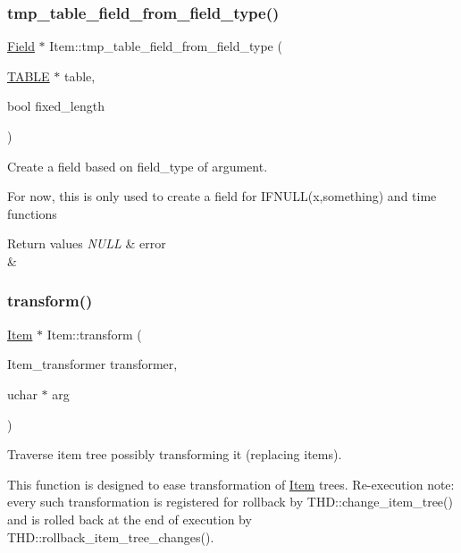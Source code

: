 \subsubsection{\texorpdfstring{tmp\+\_\+table\+\_\+field\+\_\+from\+\_\+field\+\_\+type()}{tmp\_table\_field\_from\_field\_type()}}
{\footnotesize\ttfamily \mbox{\hyperlink{classField}{Field}} $\ast$ Item\+::tmp\+\_\+table\+\_\+field\+\_\+from\+\_\+field\+\_\+type (\begin{DoxyParamCaption}\item[{\mbox{\hyperlink{structTABLE}{T\+A\+B\+LE}} $\ast$}]{table,  }\item[{bool}]{fixed\+\_\+length }\end{DoxyParamCaption})}

Create a field based on field\+\_\+type of argument.

For now, this is only used to create a field for I\+F\+N\+U\+L\+L(x,something) and time functions


\begin{DoxyRetVals}{Return values}
{\em N\+U\+LL} & error \\
\hline
{\em } & \\
\hline
\end{DoxyRetVals}
\mbox{\label{classItem_ae4459c9d19c2c656c63da3bbd32760e5}} 
\subsubsection{\texorpdfstring{transform()}{transform()}}
{\footnotesize\ttfamily \mbox{\hyperlink{classItem}{Item}} $\ast$ Item\+::transform (\begin{DoxyParamCaption}\item[{Item\+\_\+transformer}]{transformer,  }\item[{uchar $\ast$}]{arg }\end{DoxyParamCaption})\hspace{0.3cm}{\ttfamily [virtual]}}

Traverse item tree possibly transforming it (replacing items).

This function is designed to ease transformation of \mbox{\hyperlink{classItem}{Item}} trees. Re-\/execution note\+: every such transformation is registered for rollback by T\+H\+D\+::change\+\_\+item\+\_\+tree() and is rolled back at the end of execution by T\+H\+D\+::rollback\+\_\+item\+\_\+tree\+\_\+changes().

